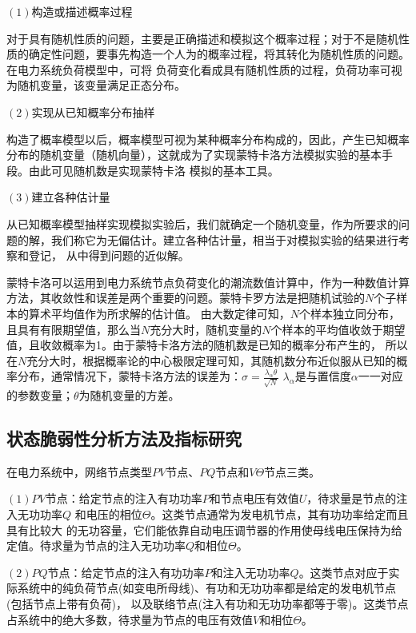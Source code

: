 $(1)$构造或描述概率过程

对于具有随机性质的问题，主要是正确描述和模拟这个概率过程；对于不是随机性质的确定性问题，要事先构造一个人为的概率过程，将其转化为随机性质的问题。在电力系统负荷模型中，可将
负荷变化看成具有随机性质的过程，负荷功率可视为随机变量，该变量满足正态分布。

$(2)$实现从已知概率分布抽样

构造了概率模型以后，概率模型可视为某种概率分布构成的，因此，产生已知概率分布的随机变量（随机向量），这就成为了实现蒙特卡洛方法模拟实验的基本手段。由此可见随机数是实现蒙特卡洛
模拟的基本工具。

$(3)$建立各种估计量

从已知概率模型抽样实现模拟实验后，我们就确定一个随机变量，作为所要求的问题的解，我们称它为无偏估计。建立各种估计量，相当于对模拟实验的结果进行考察和登记，
从中得到问题的近似解。

蒙特卡洛可以运用到电力系统节点负荷变化的潮流数值计算中，作为一种数值计算方法，其收敛性和误差是两个重要的问题。蒙特卡罗方法是把随机试验的$N$个子样本的算术平均值作为所求解的估计值。
由大数定律可知，$N$个样本独立同分布，且具有有限期望值，那么当$N$充分大时，随机变量的$N$个样本的平均值收敛于期望值，且收敛概率为1。由于蒙特卡洛方法的随机数是已知的概率分布产生的，
所以在$N$充分大时，根据概率论的中心极限定理可知，其随机数分布近似服从已知的概率分布，通常情况下，蒙特卡洛方法的误差为：$\sigma = \frac{\lambda_{\alpha} \theta}{\sqrt{N}}$
$\lambda_{\alpha}$是与置信度$\alpha$一一对应的参数变量；$\theta$为随机变量的方差。



\subsection{状态脆弱性分析方法及指标研究}
\label{sec:static}

在电力系统中，网络节点类型$PV$节点、$PQ$节点和$V\Theta$节点三类。

$(1)$$PV$节点：给定节点的注入有功功率$P$和节点电压有效值$U$，待求量是节点的注入无功功率$Q$ 和电压的相位$\Theta$。这类节点通常为发电机节点，其有功功率给定而且具有比较大
的无功容量，它们能依靠自动电压调节器的作用使母线电压保持为给定值。待求量为节点的注入无功功率$Q$和相位$\Theta$。

$(2)$$PQ$节点：给定节点的注入有功功率$P$和注入无功功率$Q$。这类节点对应于实际系统中的纯负荷节点(如变电所母线)、有功和无功功率都是给定的发电机节点(包括节点上带有负荷)，
以及联络节点(注入有功和无功功率都等于零)。这类节点占系统中的绝大多数，待求量为节点的电压有效值$V$和相位$\Theta$。


